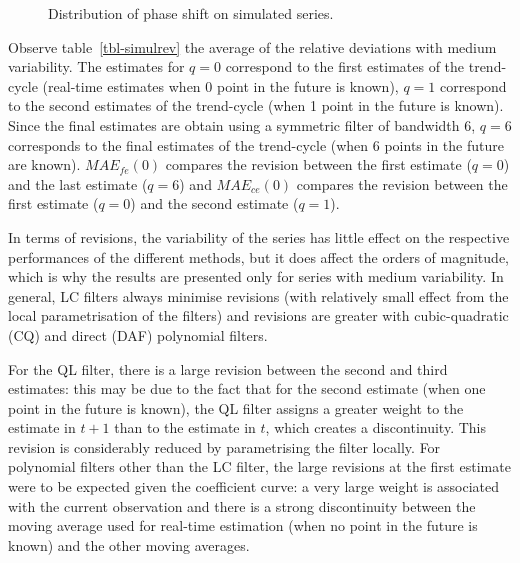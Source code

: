 \documentclass[
]{article}
\newcommand\1{\mathds{1}}
\begin{document}
\begin{figure}[H]

\caption{\label{fig-graphstpsimul}Distribution of phase shift on
simulated series.}


\end{figure}%

Observe table~\ref{tbl-simulrev} the average of the relative deviations
with medium variability. The estimates for \(q=0\) correspond to the
first estimates of the trend-cycle (real-time estimates when 0 point in
the future is known), \(q=1\) correspond to the second estimates of the
trend-cycle (when 1 point in the future is known). Since the final
estimates are obtain using a symmetric filter of bandwidth 6, \(q=6\)
corresponds to the final estimates of the trend-cycle (when 6 points in
the future are known). \(MAE_{fe}(0)\) compares the revision between the
first estimate (\(q=0\)) and the last estimate (\(q=6\)) and
\(MAE_{ce}(0)\) compares the revision between the first estimate
(\(q=0\)) and the second estimate (\(q=1\)).

In terms of revisions, the variability of the series has little effect
on the respective performances of the different methods, but it does
affect the orders of magnitude, which is why the results are presented
only for series with medium variability. In general, LC filters always
minimise revisions (with relatively small effect from the local
parametrisation of the filters) and revisions are greater with
cubic-quadratic (CQ) and direct (DAF) polynomial filters.

For the QL filter, there is a large revision between the second and
third estimates: this may be due to the fact that for the second
estimate (when one point in the future is known), the QL filter assigns
a greater weight to the estimate in \(t+1\) than to the estimate in
\(t\), which creates a discontinuity. This revision is considerably
reduced by parametrising the filter locally. For polynomial filters
other than the LC filter, the large revisions at the first estimate were
to be expected given the coefficient curve: a very large weight is
associated with the current observation and there is a strong
discontinuity between the moving average used for real-time estimation
(when no point in the future is known) and the other moving averages.
\end{document}
